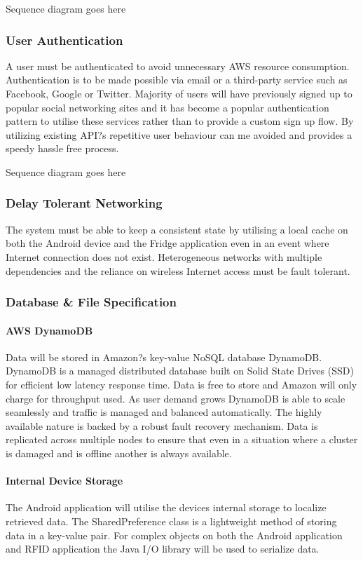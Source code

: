 \documentclass[a4paper, 11pt]{article}
\begin{document}
Sequence diagram goes here

\subsubsection {User Authentication}
A user must be authenticated to avoid unnecessary AWS resource consumption. Authentication is to be made possible via email or a third-party service such as Facebook, Google or Twitter. Majority of users will have previously signed up to popular social networking sites and it has become a popular authentication pattern to utilise these services rather than to provide a custom sign up flow. By utilizing existing API?s repetitive user behaviour can me avoided and provides a speedy hassle free process. 

Sequence diagram goes here

\subsubsection {Delay Tolerant Networking}
The system must be able to keep a consistent state by utilising a local cache on both the Android device and the Fridge application even in an event where Internet connection does not exist. Heterogeneous networks with multiple dependencies and the reliance on wireless Internet access must be fault tolerant.

\subsubsection {Database \& File Specification}
\paragraph{AWS DynamoDB}Data will be stored in Amazon?s key-value NoSQL database DynamoDB. DynamoDB is a managed distributed database built on Solid State Drives (SSD) for efficient low latency response time. Data is free to store and Amazon will only charge for throughput used. As user demand grows DynamoDB is able to scale seamlessly and traffic is managed and balanced automatically. The highly available nature is backed by a robust fault recovery mechanism. Data is replicated across multiple nodes to ensure that even in a situation where a cluster is damaged and is offline another is always available. 

\paragraph{Internal Device Storage}The Android application will utilise the devices internal storage to localize retrieved data.  The SharedPreference class is a lightweight method of storing data in a key-value pair. For complex objects on both the Android application and RFID application the Java I/O library will be used to serialize data.  
\end{document}
